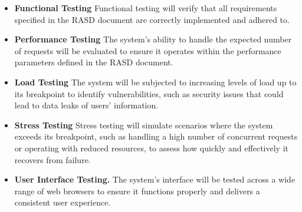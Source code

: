 \begin{itemize}
    \item \textbf{Functional Testing} Functional testing will verify that all requirements specified in the RASD document are correctly implemented and adhered to.  
    
    \item \textbf{Performance Testing} The system's ability to handle the expected number of requests will be evaluated to ensure it operates within the performance parameters defined in the RASD document.  
    
    \item \textbf{Load Testing} The system will be subjected to increasing levels of load up to its breakpoint to identify vulnerabilities, such as security issues that could lead to data leaks of users' information.  
    
    \item \textbf{Stress Testing} Stress testing will simulate scenarios where the system exceeds its breakpoint, such as handling a high number of concurrent requests or operating with reduced resources, to assess how quickly and effectively it recovers from failure.  
    
    \item \textbf{User Interface Testing.} The system's interface will be tested across a wide range of web browsers to ensure it functions properly and delivers a consistent user experience.
\end{itemize}

\newpage